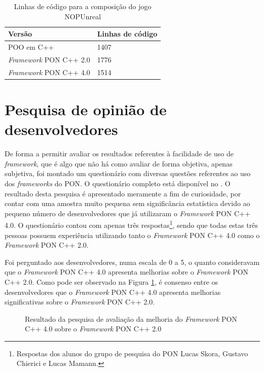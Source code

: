 \begin{table}[!htb]
\centering
\caption{Linhas de código para a composição do jogo NOPUnreal}
\smallskip
\begin{tabularx}{0.8\textwidth}{|X|X|}
\hline
Versão & Linhas de código\\
\hline
POO em C++ & 1407 \\
\hline
\textit{Framework} PON C++ 2.0 & 1776 \\
\hline
\textit{Framework} PON C++ 4.0 & 1514 \\
\hline
\end{tabularx}
\label{tab:linhas_de_codigo_nopunreal}
\end{table}

\section{Pesquisa de opinião de desenvolvedores}\label{sec:opiniao}

De forma a permitir avaliar os resultados referentes à facilidade de uso de
\textit{framework}, que é algo que não há como avaliar de forma objetiva, apenas
subjetiva, foi montado um questionário com diversas questões referentes ao uso
dos \textit{frameworks} do PON. O questionário completo está disponível no
. O resultado desta pesquisa é apresentado meramente a
fim de curiosidade, por contar com uma amostra muito pequena sem significância
estatística devido ao pequeno número de desenvolvedores que já utilizaram o
\textit{Framework} PON C++ 4.0. O questionário contou com apenas três
respostas\footnote{Respostas dos alunos do grupo de pesquisa do PON Lucas Skora,
Gustavo Chierici e Lucas Mamann.}, sendo que todas estas três pessoas possuem
experiência utilizando tanto o \textit{Framework} PON C++ 4.0 como o
\textit{Framework} PON C++ 2.0.

Foi perguntado aos desenvolvedores, numa escala de 0 a 5, o quanto consideravam
que o \textit{Framework} PON C++ 4.0 apresenta melhorias sobre o
\textit{Framework} PON C++ 2.0. Como pode ser observado na Figura
\ref{fig:fw_compare}, é consenso entre os desenvolvedores que o
\textit{Framework} PON C++ 4.0 apresenta melhorias significativas sobre o
\textit{Framework} PON C++ 2.0.

\begin{figure}[!htb]
\centering
{}
\caption{Resultado da pesquisa de avaliação da melhoria do \textit{Framework}
PON C++ 4.0 sobre o \textit{Framework} PON C++ 2.0}
\label{fig:fw_compare}
\end{figure}

